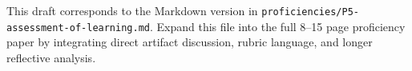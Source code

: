 \documentclass[12pt]{article}
\begin{document}
\begin{titlepage}\begin{center}\vspace*{0.2\textheight}{\Large\bfseries Proficiency 5: Assessment of Learning\par}\vspace{2em}{\PortfolioAuthor\par}{\PortfolioAffiliation\par}{\PortfolioProgram\par}\vspace{2em}{\PortfolioDate\par}\end{center}\end{titlepage}
This draft corresponds to the Markdown version in \texttt{proficiencies/P5-assessment-of-learning.md}. Expand this file into the full 8--15 page proficiency paper by integrating direct artifact discussion, rubric language, and longer reflective analysis.
\end{document}
